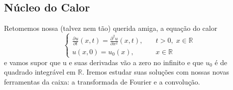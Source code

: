 \documentclass[../pde_notes.tex]{subfiles}
\begin{document}
\subsection{Núcleo do Calor}
Retomemos nossa (talvez nem tão) querida amiga, a equação do calor
\[
	\left\{\begin{array}{ll}
		\frac{\partial^{}u}{\partial t^{}}(x, t) = \frac{\partial^{2}u}{\partial x^{2}}(x, t), & \quad t > 0,\; x\in \mathbb{R} \\
		u(x, 0) = u_{0}(x),                                                                    & \quad x\in \mathbb{R}
	\end{array}\right.
\]
e vamos supor que u e suas derivadas vão a zero no infinito e que \(u_{0}\) é de quadrado integrável em \(\mathbb{R}\). Iremos estudar suas soluções com nossas novas ferramentas da caixa: a transformada de Fourier e a convolução.
\end{document}

